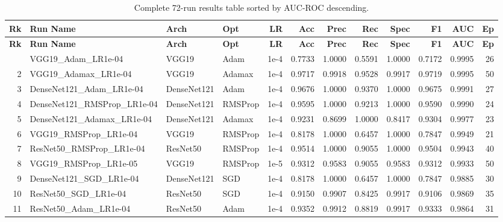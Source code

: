 \clearpage
\begingroup
\tiny
\setlength{\tabcolsep}{2.5pt}
\begin{longtable}{r l l l r r r r r r r r}
  \caption{Complete 72-run results table sorted by AUC-ROC descending.}
  \label{tab:full-results} \\
  \toprule
  \rowcolor{tableheader}
  \textbf{Rk} & \textbf{Run Name} & \textbf{Arch} & \textbf{Opt} & \textbf{LR} &
  \textbf{Acc} & \textbf{Prec} & \textbf{Rec} & \textbf{Spec} & \textbf{F1} &
  \textbf{AUC} & \textbf{Ep} \\
  \midrule
  \endfirsthead
  \toprule
  \rowcolor{tableheader}
  \textbf{Rk} & \textbf{Run Name} & \textbf{Arch} & \textbf{Opt} & \textbf{LR} &
  \textbf{Acc} & \textbf{Prec} & \textbf{Rec} & \textbf{Spec} & \textbf{F1} &
  \textbf{AUC} & \textbf{Ep} \\
  \midrule
  \endhead
  \bottomrule
  \endfoot
    1 & VGG19\_Adam\_LR1e-04      & VGG19 & Adam    & 1e-4 & 0.7733 & 1.0000 & 0.5591 & 1.0000 & 0.7172 & 0.9995 & 26 \\
    2 & VGG19\_Adamax\_LR1e-04    & VGG19 & Adamax  & 1e-4 & 0.9717 & 0.9918 & 0.9528 & 0.9917 & 0.9719 & 0.9995 & 50 \\
    3 & DenseNet121\_Adam\_LR1e-04 & DenseNet121 & Adam & 1e-4 & 0.9676 & 1.0000 & 0.9370 & 1.0000 & 0.9675 & 0.9991 & 27 \\
    4 & DenseNet121\_RMSProp\_LR1e-04 & DenseNet121 & RMSProp & 1e-4 & 0.9595 & 1.0000 & 0.9213 & 1.0000 & 0.9590 & 0.9990 & 24 \\
    5 & DenseNet121\_Adamax\_LR1e-04 & DenseNet121 & Adamax & 1e-4 & 0.9231 & 0.8699 & 1.0000 & 0.8417 & 0.9304 & 0.9977 & 23 \\
    6 & VGG19\_RMSProp\_LR1e-04   & VGG19 & RMSProp & 1e-4 & 0.8178 & 1.0000 & 0.6457 & 1.0000 & 0.7847 & 0.9949 & 21 \\
    7 & ResNet50\_RMSProp\_LR1e-04 & ResNet50 & RMSProp & 1e-4 & 0.9514 & 1.0000 & 0.9055 & 1.0000 & 0.9504 & 0.9943 & 40 \\
    8 & VGG19\_RMSProp\_LR1e-05   & VGG19 & RMSProp & 1e-5 & 0.9312 & 0.9583 & 0.9055 & 0.9583 & 0.9312 & 0.9933 & 50 \\
    9 & DenseNet121\_SGD\_LR1e-04 & DenseNet121 & SGD & 1e-4 & 0.8178 & 1.0000 & 0.6457 & 1.0000 & 0.7847 & 0.9885 & 30 \\
   10 & ResNet50\_SGD\_LR1e-04    & ResNet50 & SGD & 1e-4 & 0.9150 & 0.9907 & 0.8425 & 0.9917 & 0.9106 & 0.9869 & 35 \\
   11 & ResNet50\_Adam\_LR1e-04   & ResNet50 & Adam & 1e-4 & 0.9352 & 0.9912 & 0.8819 & 0.9917 & 0.9333 & 0.9864 & 31 \\

\end{longtable}

